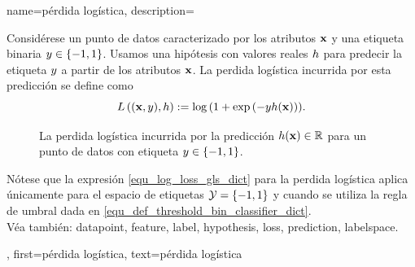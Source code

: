 	{name={pérdida logística}, 
		description={Considérese 
			un punto de datos caracterizado por los atributos ${\bf x}$ y una etiqueta binaria $y \in \{-1,1\}$. 
			Usamos una hipótesis con valores reales $h$ para predecir la etiqueta $y$ 
			a partir de los atributos ${\bf x}$. La perdida logística incurrida por esta predicción se 
			define como
		\begin{equation} 
			\label{equ_log_loss_gls_dict}
			L\left(({\bf x},y),h \right) :=  \log\, ( 1 + \exp\,(- y h({\bf x}))).
		\end{equation}
		\begin{figure}[H]
		\begin{center}
			\caption{La perdida logística incurrida por la predicción $h({\bf x}) \in \mathbb{R}$ 
				para un punto de datos con etiqueta $y \in \{-1,1\}$.}
			\label{fig_logloss_dict}
		\end{center}
		\end{figure}
		Nótese que la expresión \eqref{equ_log_loss_gls_dict} 
		para la perdida logística aplica únicamente para el espacio de etiquetas $\mathcal{Y} = \{ -1,1\}$ y cuando se utiliza 
		la regla de umbral dada en \eqref{equ_def_threshold_bin_classifier_dict}. 
			\\
			Véa también: \gls{datapoint}, \gls{feature}, \gls{label}, \gls{hypothesis}, \gls{loss}, \gls{prediction}, \gls{labelspace}.},
		first={pérdida logística},
		text={pérdida logística}
	}

